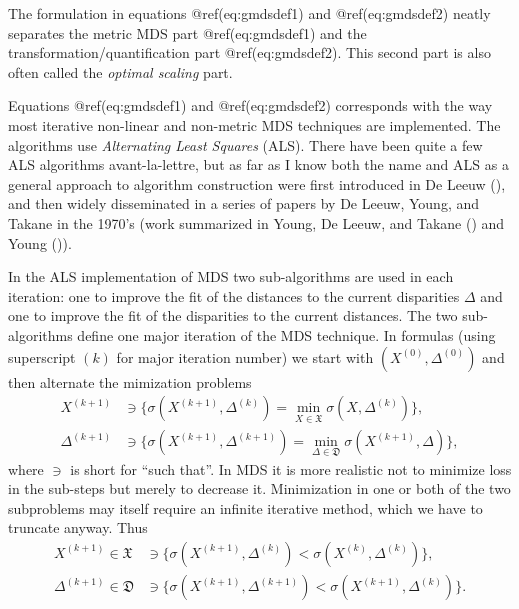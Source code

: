 \documentclass[
  12pt,
  letterpaper,
  DIV=11,
  numbers=noendperiod]{scrartcl}
\theoremstyle{plain}
\theoremstyle{remark}
\begin{document}
The formulation in equations @ref(eq:gmdsdef1) and @ref(eq:gmdsdef2)
neatly separates the metric MDS part @ref(eq:gmdsdef1) and the
transformation/quantification part @ref(eq:gmdsdef2). This second part
is also often called the \emph{optimal scaling} part.

Equations @ref(eq:gmdsdef1) and @ref(eq:gmdsdef2) corresponds with the
way most iterative non-linear and non-metric MDS techniques are
implemented. The algorithms use \emph{Alternating Least Squares} (ALS).
There have been quite a few ALS algorithms avant-la-lettre, but as far
as I know both the name and ALS as a general approach to algorithm
construction were first introduced in De Leeuw
(), and then widely disseminated in a
series of papers by De Leeuw, Young, and Takane in the 1970's (work
summarized in Young, De Leeuw, and Takane
() and Young
()).

In the ALS implementation of MDS two sub-algorithms are used in each
iteration: one to improve the fit of the distances to the current
disparities \(\Delta\) and one to improve the fit of the disparities to
the current distances. The two sub-algorithms define one major iteration
of the MDS technique. In formulas (using superscript \((k)\) for major
iteration number) we start with \((X^{(0)},\Delta^{(0)})\) and then
alternate the mimization problems \begin{subequations}
\begin{align}
X^{(k+1)}&\ni\{\sigma(X^{(k+1)},\Delta^{(k)})=\min_{X\in\mathfrak{X}}\sigma(X,\Delta^{(k)})\},\\
\Delta^{(k+1)}&\ni\{\sigma(X^{(k+1)},\Delta^{(k+1)})=\min_{\Delta\in\mathfrak{D}}\sigma(X^{(k+1)},\Delta)\},
\end{align}
\end{subequations} where \(\ni\) is short for ``such that''. In MDS it
is more realistic not to minimize loss in the sub-steps but merely to
decrease it. Minimization in one or both of the two subproblems may
itself require an infinite iterative method, which we have to truncate
anyway. Thus \begin{subequations}
\begin{align}
X^{(k+1)}\in\mathfrak{X}&\ni\{\sigma(X^{(k+1)},\Delta^{(k)})<\sigma(X^{(k)},\Delta^{(k)})\},\\
\Delta^{(k+1)}\in\mathfrak{D}&\ni\{\sigma(X^{(k+1)},\Delta^{(k+1)})<\sigma(X^{(k+1)},\Delta^{(k)})\}.
\end{align}
\end{subequations}
\end{document}
